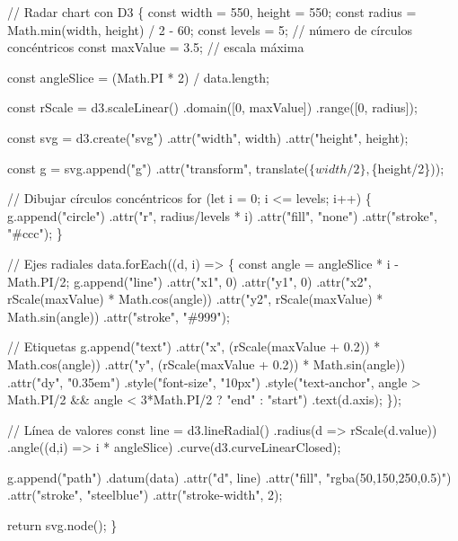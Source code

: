 \documentclass[
  letterpaper,
]{book}
\newenvironment{Shaded}{\begin{snugshade}}{\end{snugshade}}
\newcommand{\NormalTok}[1]{\textcolor[rgb]{0.00,0.23,0.31}{#1}}
\begin{document}
\begin{Shaded}
\begin{Highlighting}[]
\NormalTok{// Radar chart con D3}
\NormalTok{\{}
\NormalTok{  const width = 550, height = 550;}
\NormalTok{  const radius = Math.min(width, height) / 2 {-} 60;}
\NormalTok{  const levels = 5; // número de círculos concéntricos}
\NormalTok{  const maxValue = 3.5; // escala máxima}

\NormalTok{  const angleSlice = (Math.PI * 2) / data.length;}

\NormalTok{  const rScale = d3.scaleLinear()}
\NormalTok{    .domain([0, maxValue])}
\NormalTok{    .range([0, radius]);}

\NormalTok{  const svg = d3.create("svg")}
\NormalTok{    .attr("width", width)}
\NormalTok{    .attr("height", height);}

\NormalTok{  const g = svg.append("g")}
\NormalTok{    .attr("transform", \textasciigrave{}translate($\{width/2\},$\{height/2\})\textasciigrave{});}

\NormalTok{  // Dibujar círculos concéntricos}
\NormalTok{  for (let i = 0; i \textless{}= levels; i++) \{}
\NormalTok{    g.append("circle")}
\NormalTok{      .attr("r", radius/levels * i)}
\NormalTok{      .attr("fill", "none")}
\NormalTok{      .attr("stroke", "\#ccc");}
\NormalTok{  \}}

\NormalTok{  // Ejes radiales}
\NormalTok{  data.forEach((d, i) =\textgreater{} \{}
\NormalTok{    const angle = angleSlice * i {-} Math.PI/2;}
\NormalTok{    g.append("line")}
\NormalTok{      .attr("x1", 0)}
\NormalTok{      .attr("y1", 0)}
\NormalTok{      .attr("x2", rScale(maxValue) * Math.cos(angle))}
\NormalTok{      .attr("y2", rScale(maxValue) * Math.sin(angle))}
\NormalTok{      .attr("stroke", "\#999");}

\NormalTok{    // Etiquetas}
\NormalTok{    g.append("text")}
\NormalTok{      .attr("x", (rScale(maxValue + 0.2)) * Math.cos(angle))}
\NormalTok{      .attr("y", (rScale(maxValue + 0.2)) * Math.sin(angle))}
\NormalTok{      .attr("dy", "0.35em")}
\NormalTok{      .style("font{-}size", "10px")}
\NormalTok{      .style("text{-}anchor", angle \textgreater{} Math.PI/2 \&\& angle \textless{} 3*Math.PI/2 ? "end" : "start")}
\NormalTok{      .text(d.axis);}
\NormalTok{  \});}

\NormalTok{  // Línea de valores}
\NormalTok{  const line = d3.lineRadial()}
\NormalTok{    .radius(d =\textgreater{} rScale(d.value))}
\NormalTok{    .angle((d,i) =\textgreater{} i * angleSlice)}
\NormalTok{    .curve(d3.curveLinearClosed);}

\NormalTok{  g.append("path")}
\NormalTok{    .datum(data)}
\NormalTok{    .attr("d", line)}
\NormalTok{    .attr("fill", "rgba(50,150,250,0.5)")}
\NormalTok{    .attr("stroke", "steelblue")}
\NormalTok{    .attr("stroke{-}width", 2);}

\NormalTok{  return svg.node();}
\NormalTok{\}}
\end{Highlighting}
\end{Shaded}
\end{document}
